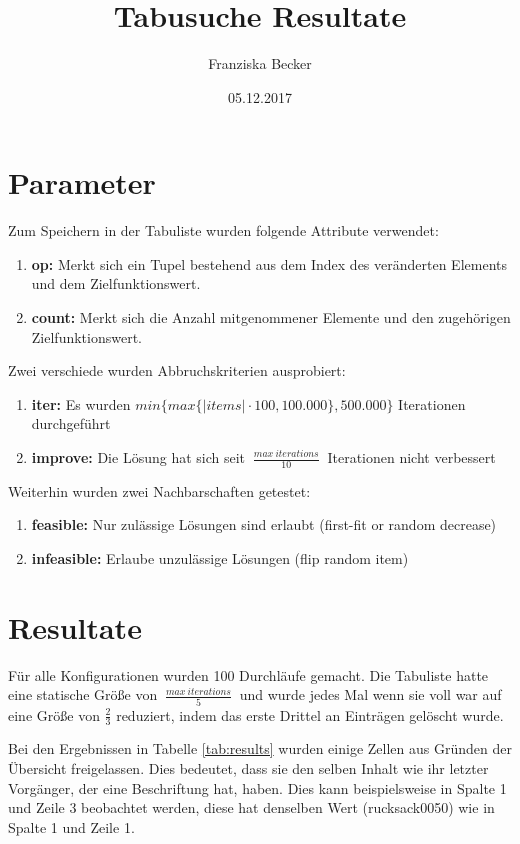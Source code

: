 \documentclass[11pt,a4paper]{article}
\title{\vspace{-2cm}Tabusuche Resultate}
\author{Franziska Becker}
\date{05.12.2017}
\begin{document}
\maketitle

\section{Parameter}

Zum Speichern in der Tabuliste wurden folgende Attribute verwendet:
\begin{enumerate}
  \item \textbf{op:} Merkt sich ein Tupel bestehend aus dem Index des veränderten Elements und dem Zielfunktionswert.
  \item \textbf{count:} Merkt sich die Anzahl mitgenommener Elemente und den zugehörigen Zielfunktionswert.
\end{enumerate}

Zwei verschiede wurden Abbruchskriterien ausprobiert:
\begin{enumerate}
    \item \textbf{iter:} Es wurden \(min\{ max\{ | items | \cdot 100, 100.000\}, 500.000\}\) Iterationen durchgeführt
    \item \textbf{improve:} Die Lösung hat sich seit \(~\frac{max~iterations}{10}~\) Iterationen nicht verbessert
\end{enumerate}

Weiterhin wurden zwei Nachbarschaften getestet:
\begin{enumerate}
    \item \textbf{feasible:} Nur zulässige Lösungen sind erlaubt (first-fit or random decrease)
    \item \textbf{infeasible:} Erlaube unzulässige Lösungen (flip random item) 
\end{enumerate}

\section{Resultate}

Für alle Konfigurationen wurden 100 Durchläufe gemacht. Die Tabuliste hatte eine statische Größe von \(~\frac{max~iterations}{5}~\) und wurde jedes Mal wenn sie voll war auf eine Größe von \(\frac{2}{3}\) reduziert, indem das erste Drittel an Einträgen gelöscht wurde.

Bei den Ergebnissen in Tabelle \ref{tab:results} wurden einige Zellen aus Gründen der Übersicht freigelassen. Dies bedeutet, dass sie den selben Inhalt wie ihr letzter Vorgänger, der eine Beschriftung hat, haben. Dies kann beispielsweise in Spalte 1 und Zeile 3 beobachtet werden, diese hat denselben Wert (rucksack0050) wie in Spalte 1 und Zeile 1.
\end{document}
